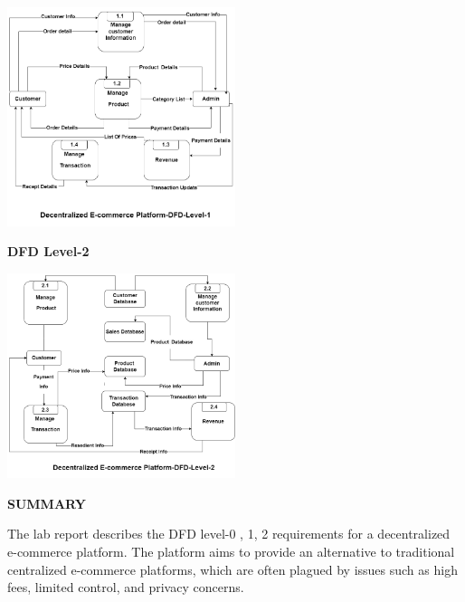 \documentclass[a4paper,11pt]{article}
\begin{document}
\begin{center}
\begin{center}
\vspace{0.5cm}

\includegraphics[width=0.5\textwidth]{dfd level-1.png} 

\textbf{DFD Level-2}

\vspace{0.5cm}

\includegraphics[width=0.5\textwidth]{dfd level-2.png} 

\end{center}



\newpage


\begin{center}
    \textbf{\Large SUMMARY }
    \vspace{1cm}



    
The lab report describes the DFD level-0 , 1, 2 requirements for a decentralized e-commerce platform. The platform aims to provide an alternative to traditional centralized e-commerce platforms, which are often plagued by issues such as high fees, limited control, and privacy concerns.

\vspace{0.5cm}


\end{center}
\end{center}
\end{document}

